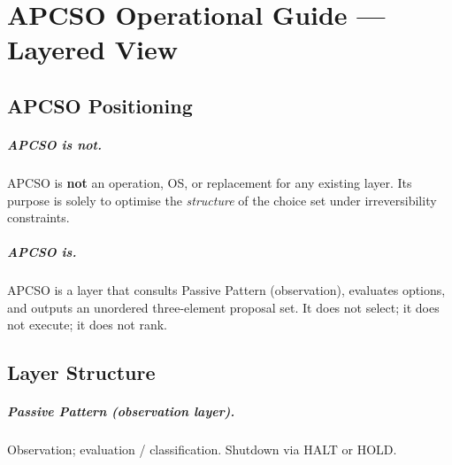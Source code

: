 
\chapter{APCSO Operational Guide --- Layered View}
\label{ch:apcso-guide}


\section{APCSO Positioning}
\label{sec:apcso-positioning}

\paragraph{APCSO is not.}
APCSO is \textbf{not} an operation, OS, or replacement for any
existing layer. Its purpose is solely to optimise the
\emph{structure} of the choice set under irreversibility constraints.

\paragraph{APCSO is.}
APCSO is a layer that consults Passive Pattern (observation),
evaluates options, and outputs an unordered three-element proposal
set. It does not select; it does not execute; it does not rank.

\section{Layer Structure}
\label{sec:apcso-layer-structure}

\paragraph{Passive Pattern (observation layer).}
Observation; evaluation / classification. Shutdown via HALT or HOLD.

